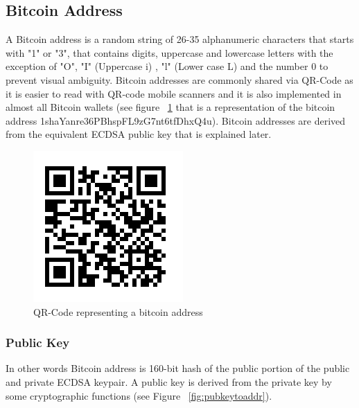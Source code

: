 \subsection{Bitcoin Address}
A Bitcoin address is a random string of 26-35 alphanumeric characters that starts with "1" or "3", that contains digits, uppercase and lowercase letters with the exception of "O", "I" (Uppercase i) , "l" (Lower case L) and the number 0 to prevent visual ambiguity. Bitcoin addresses are commonly shared via QR-Code as it is easier to read with QR-code mobile scanners and it is also implemented in almost all Bitcoin wallets (see figure ~\ref{fig:bitcoinqr} that is a representation of the bitcoin address 1shaYanre36PBhspFL9zG7nt6tfDhxQ4u). Bitcoin addresses are derived from the equivalent ECDSA public key that is explained later.

\begin{figure}[htb]
\centering
\includegraphics[scale=0.8]{fig/bitcoinqr.png}
  \caption{QR-Code representing a bitcoin address}
\label{fig:bitcoinqr}
\end{figure}

\subsubsection{Public Key}
 In other words Bitcoin address is 160-bit hash of the public portion of the public and private ECDSA keypair. A public key is derived from the private key by some cryptographic functions (see Figure ~\ref{fig:pubkeytoaddr}). 

